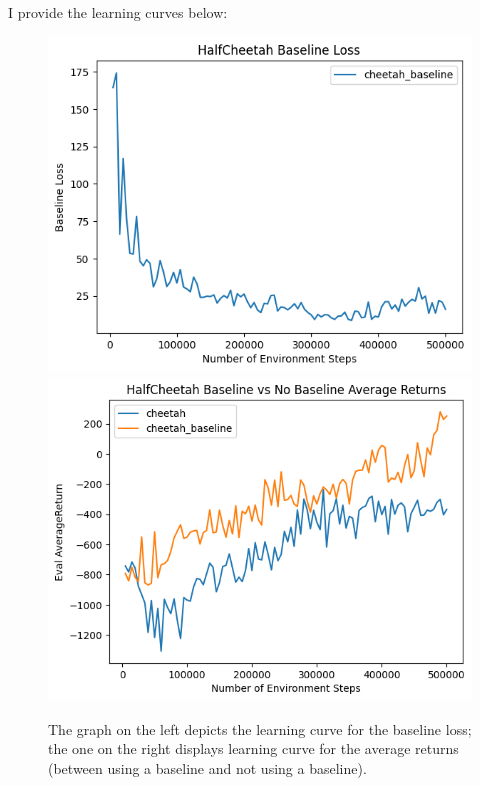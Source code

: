 \documentclass{article}
\begin{document}
\begin{sol}
    I provide the learning curves below:
    \begin{figure}[h!]
        \begin{center}
        \includegraphics[width=\textwidth/9*4]{q4_cheetah_baseline_loss.png}
        \hspace*{1cm}
        \includegraphics[width=\textwidth/9*4]{q4_cheetah_baseline_avg_returns.png}
        \end{center}
        \caption{\color{darkblue} The graph on the left depicts the learning curve for the baseline loss; the one on the right displays learning curve for the average returns (between using a baseline and not using a baseline). }

\end{figure}
\end{sol}
\end{document}
